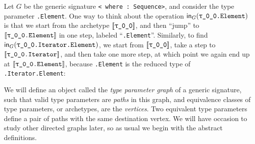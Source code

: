 \documentclass[../generics]{subfiles}
\begin{document}
Let $G$ be the generic signature \texttt{<\rT\ where \rT:\ Sequence>}, and consider the type parameter \texttt{\rT.Element}. One way to think about the operation $\MapIn(\texttt{\rT.Element})$ is that we start from the archetype $\archetype{\rT}$, and then ``jump'' to $\archetype{\rT.Element}$ in one step, labeled ``\texttt{.Element}''. Similarly, to find $\MapIn(\texttt{\rT.Iterator.Element})$, we start from $\archetype{\rT}$, take a step to $\archetype{\rT.Iterator}$, and then take one more step, at which point we again end up at $\archetype{\rT.Element}$, because \texttt{\rT.Element} is the reduced type of \texttt{\rT.Iterator.Element}:
\begin{center}
\end{center}
We will define an object called the \emph{type parameter graph} of a generic signature, such that valid type parameters are \emph{paths} in this graph, and equivalence classes of type parameters, or archetypes, are the \emph{vertices}. Two equivalent type parameters define a pair of paths with the same destination vertex. We will have occasion to study other directed graphs later, so as usual we begin with the abstract definitions.
\end{document}
